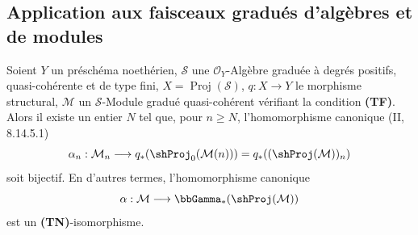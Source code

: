 \subsection{Application aux faisceaux gradués d'algèbres et de modules}
\label{subsection:III.2.3-fr}

\begin{theorem}[2.3.1]
\label{III.2.3.1-fr}
Soient $Y$ un préschéma noethérien, $\mathcal S$ une
$\mathcal O_Y$-Algèbre graduée à degrés positifs, quasi-cohérente et de
type fini, $X=\operatorname{Proj}(\mathcal S)$,
$q:X\to Y$ le morphisme structural, $\mathcal M$ un $\mathcal S$-Module
gradué quasi-cohérent vérifiant la condition \textbf{(TF)}. Alors il existe
un entier $N$ tel que, pour $n\geq N$, l'homomorphisme canonique
(II, 8.14.5.1)
\[
\alpha_n:\mathcal M_n\longrightarrow
q_*(\shProj_0(\mathcal M(n)))
=q_*((\shProj(\mathcal M))_n)
\]
soit bijectif. En d'autres termes, l'homomorphisme canonique
\[
\alpha:\mathcal M\longrightarrow\bbGamma_*(\shProj(\mathcal M))
\]
est un \textbf{(TN)}-isomorphisme.
\end{theorem}

